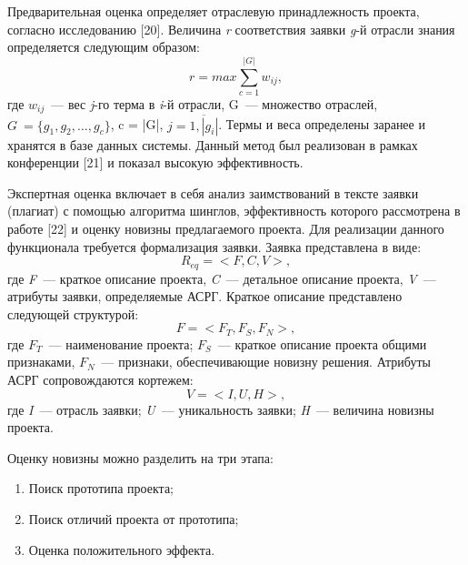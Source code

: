 Предварительная оценка определяет отраслевую принадлежность проекта, согласно исследованию [20]. Величина \textit{r} соответствия заявки \textit{g}-й отрасли знания определяется следующим образом:
\begin{equation}
  r = max\sum_{c=1}^{|G|}{w_{ij}},
\end{equation}
где $w_{ij}$~--- вес \textit{j}-го терма в \textit{i}-й отрасли, G~--- множество отраслей, $G~= \{g_1, g_2,\dots, g_c \}$, c = |G|, $j=\overline{1,|g_i|}$. Термы и веса определены заранее и хранятся в базе данных системы. Данный метод был реализован в рамках конференции [21] и показал высокую эффективность.

Экспертная оценка включает в себя анализ заимствований в тексте заявки (плагиат) с помощью алгоритма шинглов, эффективность которого рассмотрена в работе [22] и оценку новизны предлагаемого проекта. Для реализации данного функционала требуется формализация заявки. Заявка представлена в виде:
\begin{equation}
  R_{eq}= < F, C, V >,
\end{equation}
где \textit{F}~--- краткое описание проекта, \textit{C}~--- детальное описание проекта, \textit{V}~--- атрибуты заявки, определяемые АСРГ. Краткое описание представлено следующей структурой:
\begin{equation}
  F = < F_T, F_S, F_N >,
\end{equation}
где $F_T$~--- наименование проекта; $F_S$~--- краткое описание проекта общими признаками, $F_N$~--- признаки, обеспечивающие новизну решения. Атрибуты АСРГ сопровождаются кортежем:
\begin{equation}
  V = < I, U, H >,
\end{equation}
где \textit{I}~--- отрасль заявки; \textit{U}~--- уникальность заявки; \textit{H}~--- величина новизны проекта.

Оценку новизны можно разделить на три этапа:
\begin{enumerate}[noitemsep]
    \item Поиск прототипа проекта;
    \item Поиск отличий проекта от прототипа;
    \item Оценка положительного эффекта.
\end{enumerate}

